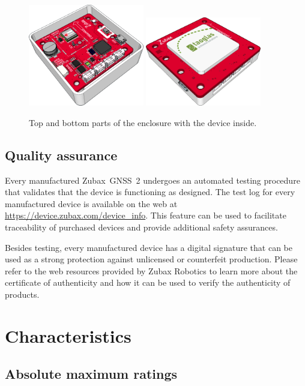 \documentclass{zubaxdoc}
\begin{document}
\begin{figure}[hbt]
	\centering
	\includegraphics[width=0.45\textwidth]{enclosure_pcb_top}
	\includegraphics[width=0.45\textwidth]{enclosure_pcb_bottom}
	\caption{Top and bottom parts of the enclosure with the device inside.}
\end{figure}

\section{Quality assurance}

Every manufactured Zubax~GNSS~2 undergoes an automated testing procedure that validates that
the device is functioning as designed.
The test log for every manufactured device is available on the web at
\url{https://device.zubax.com/device_info}.
This feature can be used to facilitate traceability of purchased devices and
provide additional safety assurances.

Besides testing, every manufactured device has a digital signature
that can be used as a strong protection against unlicensed or counterfeit production.
Please refer to the web resources provided by Zubax Robotics to learn more about the certificate of authenticity
and how it can be used to verify the authenticity of products.

\chapter{Characteristics}

\section{Absolute maximum ratings}
\end{document}
